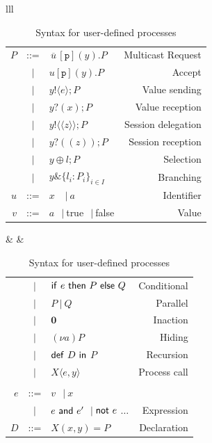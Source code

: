\documentclass[a4paper,11pt,twoside]{report}
\newcommand{\pn}{\p}
\newcommand{\ptilde}[1]{{\ensuremath{#1}}}
\newcommand{\kf}[1]{\textup{\textsf{#1}}\xspace}
\newcommand{\srsimple}[3]{\ensuremath{\bar{#1}[#2](#3)}}
\newcommand{\sr}[4]{\ensuremath{\srsimple{#1}{#2}{#3}.#4}}
\newcommand{\uu}{\ensuremath{u}}
\newcommand{\Ia}{\ensuremath{a}}
\newcommand{\y}{\ensuremath{y}}
\newcommand{\PP}{\ensuremath{P}}
\newcommand{\Q}{\ensuremath{Q}}
\newcommand{\DD}{\ensuremath{D}}
\newcommand{\sasimple}[3]{\ensuremath{#1[#2](#3)}}
\newcommand{\sa}[4]{\ensuremath{\sasimple{#1}{#2}{#3}.#4}}
\newcommand{\e}{\ensuremath{e}}
\newcommand{\x}{\ensuremath{x}}
\newcommand{\participant}[1]{\ensuremath{\mathtt{#1}}}
\newcommand{\p}{\ensuremath{\participant{p}}}
\newcommand{\z}{\ensuremath{z}}
\newcommand{\pc}{\Par}
\newcommand{\X}{\ensuremath{X}}
\newcommand{\Xsignature}{\ensuremath{\X(\at{x}, \at{y})}}
\newcommand{\Ddef}{\ensuremath{\Xsignature=\PP}}
\newcommand{\defD}{\ensuremath{\kf{def}\ \DD \ \kf{in}\ }}
\newcommand{\proccall}[3]{\ensuremath{#1\langle\ptilde{#2},\ptilde{#3}\rangle}}
\newcommand{\indexed}[4]{\ensuremath{\{#1_#3 : #2_#3\}_{#3 \in #4}}}
\newcommand{\ifthenelse}[3]{\ensuremath{\kf{if}\ #1\ \kf{then}\ #2\ \kf{else}\ #3}}
\newcommand{\inact}{\ensuremath{\mathbf{0}}}
\newcommand{\nuc}[2]{\ensuremath{(\nu #1)#2}}
\newcommand{\AND}[2]{\ensuremath{#1\ \kf{and}\ #2}}
\newcommand{\NOT}[1]{\ensuremath{\kf{not}\ #1}}
\newcommand{\true}{\kf{true}}
\newcommand{\false}{\kf{false}}
\newcommand{\va}{\ensuremath{v}}
\newcommand{\at}[1]{\ensuremath{\ptilde{#1}}}
\newcommand{\Par}{\ensuremath{\ |\ }}
\newcommand{\sep}{\ensuremath{~\mathbf{|}~ }}
\newcommand{\outS}[3]{\ensuremath{#1!\langle #2\rangle;#3}}
\newcommand{\inpS}[3]{\ensuremath{#1?( #2);#3}}
\newcommand{\sdS}[3]{\ensuremath{#1!\langle\! \langle#2\rangle \!\rangle;#3}}
\newcommand{\rdS}[3]{\ensuremath{#1?(\!(#2)\!);#3}}
\newcommand{\lselS}[3]{\ensuremath{#1 \oplus {#2};#3}}
\newcommand{\lbranchS}[1]{\ensuremath{#1 \& \indexed{l}{\PP}{i}{I}}}
\renewcommand{\bar}[1]{\overline{\,#1\,}}
\begin{document}
\begin{table}[tb]
\centering
\begin{tabular}{lll}
\begin{tabular}{rclr}
 \PP & ::=  & \sr\uu \pn\y\PP   &   {Multicast Request}\\
     & \sep & \sa\uu\p\y\PP   &   {Accept}\\
     & \sep & \outS{\y}\e\PP &    {Value sending}\\
     & \sep & \inpS{\y}\x\PP &    {Value reception}\\
     & \sep & \sdS{\y}{\z} \PP & {Session delegation}\\
     & \sep & \rdS{\y}{\z}\PP &  {Session reception}\\
     & \sep & \lselS{\y}{l}{\PP} & {Selection}\\
     & \sep & \lbranchS{\y} & {Branching}\\[1mm]
\uu & ::= & $\x$ \ \sep \Ia & {Identifier}\\
\va & ::= & \Ia \ \sep \true  \ \sep \false & {Value}\\
\end{tabular}
&
&
\begin{tabular}{rclr}
      & \sep & \ifthenelse{\e}{\PP}{\Q} & {Conditional}\\
      & \sep & \PP \pc \Q  & {Parallel}\\
      & \sep & \inact & {Inaction}\\
      & \sep & \nuc{\Ia}{\PP} & {Hiding}\\
      & \sep & \defD \PP & {Recursion}\\
      & \sep & \proccall{\X}{\e}{\y} & {Process call}
\\
\\[2mm]
\e   & ::= & \va \ \sep \x  \\
&  \sep & \AND{\e}{\e'} \sep \NOT{\e} $\ldots$
&{Expression}\\
\DD   & ::= & \Ddef &{Declaration}\\
\end{tabular}
\end{tabular}
\ \vspace{1mm}
\caption{Syntax for user-defined processes}\label{tab:syntaxM}
\end{table}
\end{document}
